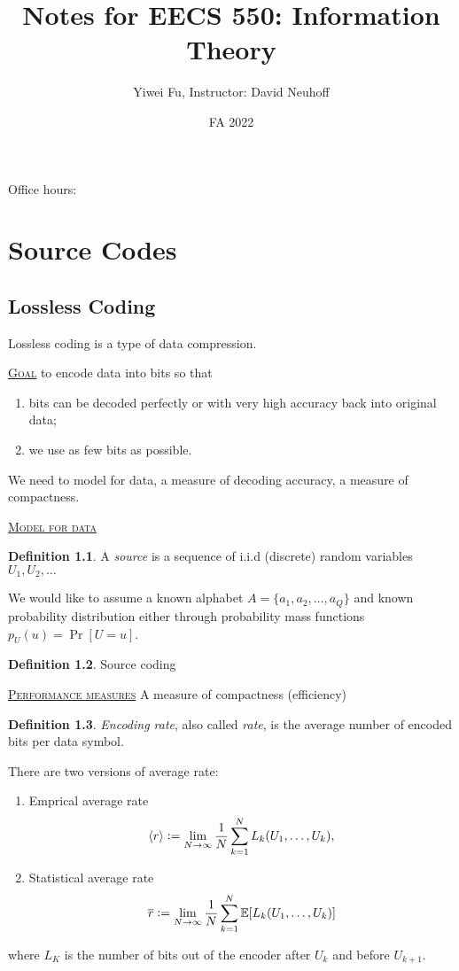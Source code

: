 \documentclass{report}
\newcommand{\defeq}{\vcentcolon=}
\newcommand{\fancyem}[1]{\underline{\textsc{#1}}}
\theoremstyle{definition}
\newtheorem{definition}{Definition}[section]
\theoremstyle{remark}
\numberwithin{equation}{section}
\begin{document}
\title{Notes for EECS 550: Information Theory}
\author{Yiwei Fu, Instructor: David Neuhoff}
\date{FA 2022}
\maketitle


\tableofcontents
Office hours: 

\clearpage
{}

\chapter{Source Codes}

\section{Lossless Coding}
Lossless coding is a type of data compression.

\fancyem{Goal} to encode data into bits so that \begin{enumerate}
  \item bits can be decoded perfectly or with very high accuracy back into original data;
  \item we use as few bits as possible.
\end{enumerate}

We need to model for data, a measure of decoding accuracy, a measure of compactness.

\fancyem{Model for data}
\begin{definition}
  A \emph{source} is a sequence of i.i.d (discrete) random variables $U_1, U_2, \ldots$
\end{definition}
We would like to assume a known alphabet $A = \{a_1, a_2, \ldots, a_Q\}$ and known probability distribution either through probability mass functions $p_U(u) = \Pr[U = u]$.

\begin{definition}
  Source coding
\end{definition}

\fancyem{Performance measures}
A measure of compactness (efficiency)

\begin{definition}
  \emph{Encoding rate}, also called \emph{rate}, is the average number of encoded bits per data symbol.

  There are two versions of average rate: \begin{enumerate}
    \item Emprical average rate \[\langle r \rangle \defeq \lim_{N \to \infty} \frac{1}{N}\sum_{k=1}^N L_k(U_1, \ldots, U_k),\]
    \item Statistical average rate
    \[
      \overline{r} \defeq \lim_{N \to \infty} \frac{1}{N}\sum_{k=1}^N \mathbb{E}[L_k(U_1, \ldots, U_k)]
    \]
  \end{enumerate}
  where $L_K$ is the number of bits out of the encoder after $U_k$ and before $U_{k+1}$.
\end{definition}
\end{document}
